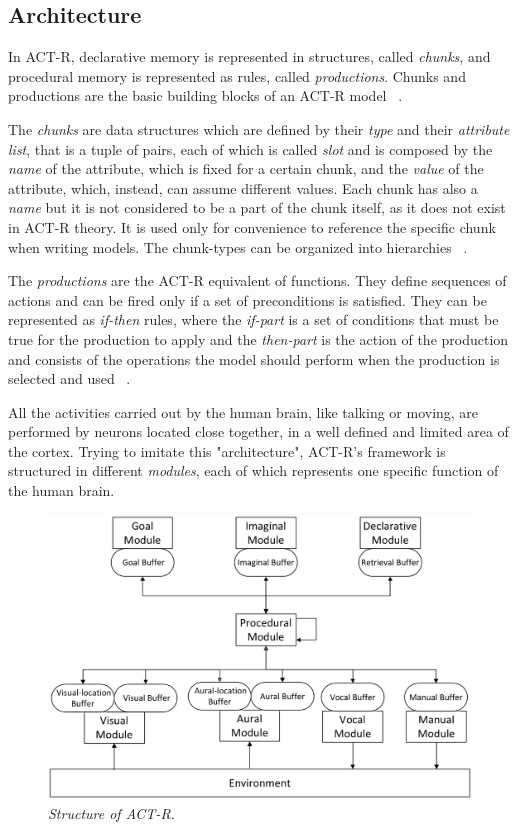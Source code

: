 	\subsection*{Architecture}
	In \mbox{ACT-R}, declarative memory is represented in structures, called \emph{chunks}, and procedural memory is represented as rules, called \emph{productions}. Chunks and productions are the basic building blocks of an ACT-R model ~\cite{actr6refman}.
	
	The \emph{chunks} are data structures which are defined by their \emph{type} and their \emph{attribute list}, that is a tuple of pairs, each of which is called \emph{slot} and is composed by the \emph{name} of the attribute, which is fixed for a certain chunk, and the \emph{value} of the attribute, which, instead, can assume different values. Each chunk has also a \emph{name} but it is not considered to be a part of the chunk itself, as it does not exist in \mbox{ACT-R} theory. It is used only for convenience to reference the specific chunk when writing models. The chunk-types can be organized into hierarchies ~\cite{actr6refman}.
	
	The \emph{productions} are the \mbox{ACT-R} equivalent of functions. They define sequences of actions and can be fired only if a set of preconditions is satisfied. They can be represented as \emph{if-then} rules, where the \emph{if-part} is a set of conditions that must be true for the production to apply and the \emph{then-part} is the action of the production and consists of the operations the model should perform when the production is selected and used ~\cite{actr6refman}.
	\newline{}

	
	All the activities carried out by the human brain, like talking or moving, are performed by neurons located close together, in a well defined and limited area of the cortex. Trying to imitate this "architecture", \mbox{ACT-R's} framework is structured in different \emph{modules}, each of which represents one specific function of the human brain. 
	
	\begin{figure}[h]
	  \begin{center} 
	    \includegraphics[scale=0.25]{images/ch_01/actr.eps}
	  \end{center} 
	  \caption{\textit{Structure of ACT-R.}}  
	  \label{fig:modulesActr}
	\end{figure}
	
